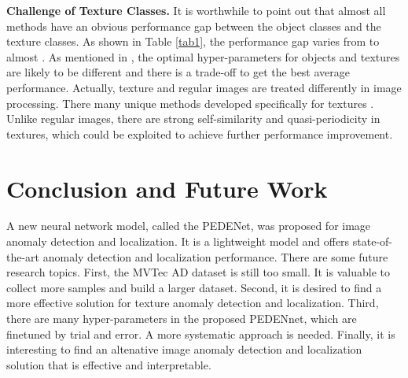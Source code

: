 \documentclass{article}
\begin{document}
\textbf{Challenge of Texture Classes.} It is worthwhile to point out
that almost all methods have an obvious performance gap between the
object classes and the texture classes. As shown in Table \ref{tab1},
the performance gap varies from  \cite{yi2020patch} to almost
 \cite{DBLP:conf/visapp/BergmannLFSS19}.  As mentioned in
\cite{yi2020patch}, the optimal hyper-parameters for objects and
textures are likely to be different and there is a trade-off to get the
best average performance.  Actually, texture and regular images are
treated differently in image processing. There many unique methods
developed specifically for textures \cite{chang1993texture,
zhang2019texture, zhang2019data, zhang2021dynamic}.  Unlike regular
images, there are strong self-similarity and quasi-periodicity in
textures, which could be exploited to achieve further performance
improvement. 

\section{Conclusion and Future Work}\label{sec:conclusion}

A new neural network model, called the PEDENet, was proposed for image
anomaly detection and localization. It is a lightweight model and offers
state-of-the-art anomaly detection and localization performance. There
are some future research topics. First, the MVTec AD dataset is still
too small. It is valuable to collect more samples and build a larger
dataset.  Second, it is desired to find a more effective solution for
texture anomaly detection and localization. Third, there are many
hyper-parameters in the proposed PEDENnet, which are finetuned by trial
and error. A more systematic approach is needed. Finally, it is
interesting to find an altenative image anomaly detection and
localization solution that is effective and interpretable.

  
  
\end{document}
